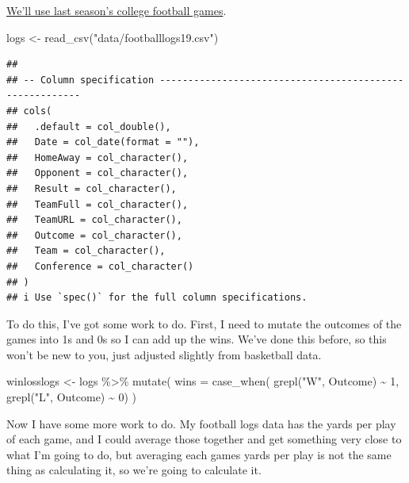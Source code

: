 \documentclass[
]{book}
\newenvironment{Shaded}{\begin{snugshade}}{\end{snugshade}}
\newcommand{\AttributeTok}[1]{\textcolor[rgb]{0.77,0.63,0.00}{#1}}
\newcommand{\DecValTok}[1]{\textcolor[rgb]{0.00,0.00,0.81}{#1}}
\newcommand{\FunctionTok}[1]{\textcolor[rgb]{0.00,0.00,0.00}{#1}}
\newcommand{\NormalTok}[1]{#1}
\newcommand{\OtherTok}[1]{\textcolor[rgb]{0.56,0.35,0.01}{#1}}
\newcommand{\SpecialCharTok}[1]{\textcolor[rgb]{0.00,0.00,0.00}{#1}}
\newcommand{\StringTok}[1]{\textcolor[rgb]{0.31,0.60,0.02}{#1}}
\begin{document}
\href{https://unl.box.com/s/2prgq48ctoxlukn6kmfjw0u1opda5s0m}{We'll use last season's college football games}.

\begin{Shaded}
\begin{Highlighting}[]
\NormalTok{logs }\OtherTok{\textless{}{-}} \FunctionTok{read\_csv}\NormalTok{(}\StringTok{"data/footballlogs19.csv"}\NormalTok{)}
\end{Highlighting}
\end{Shaded}

\begin{verbatim}
## 
## -- Column specification --------------------------------------------------------
## cols(
##   .default = col_double(),
##   Date = col_date(format = ""),
##   HomeAway = col_character(),
##   Opponent = col_character(),
##   Result = col_character(),
##   TeamFull = col_character(),
##   TeamURL = col_character(),
##   Outcome = col_character(),
##   Team = col_character(),
##   Conference = col_character()
## )
## i Use `spec()` for the full column specifications.
\end{verbatim}

To do this, I've got some work to do. First, I need to mutate the outcomes of the games into 1s and 0s so I can add up the wins. We've done this before, so this won't be new to you, just adjusted slightly from basketball data.

\begin{Shaded}
\begin{Highlighting}[]
\NormalTok{winlosslogs }\OtherTok{\textless{}{-}}\NormalTok{ logs }\SpecialCharTok{\%\textgreater{}\%} 
  \FunctionTok{mutate}\NormalTok{(}
    \AttributeTok{wins =} \FunctionTok{case\_when}\NormalTok{(}
      \FunctionTok{grepl}\NormalTok{(}\StringTok{"W"}\NormalTok{, Outcome) }\SpecialCharTok{\textasciitilde{}} \DecValTok{1}\NormalTok{, }
      \FunctionTok{grepl}\NormalTok{(}\StringTok{"L"}\NormalTok{, Outcome) }\SpecialCharTok{\textasciitilde{}} \DecValTok{0}\NormalTok{)}
\NormalTok{)}
\end{Highlighting}
\end{Shaded}

Now I have some more work to do. My football logs data has the yards per play of each game, and I could average those together and get something very close to what I'm going to do, but averaging each games yards per play is not the same thing as calculating it, so we're going to calculate it.
\end{document}
